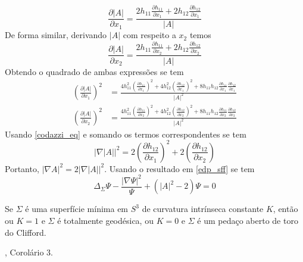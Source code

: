 \begin{demonstracao}
	\begin{equation*}
		\frac{\partial |A|}{\partial x_1} = \frac{2 h_{11} \frac{\partial h_{11}}{\partial x_1} + 2 h_{12} \frac{\partial h_{12}}{\partial x_1}}{|A|}
	\end{equation*}	
	De forma similar, derivando $ |A| $ com respeito a $ x_2 $ temos
	\begin{equation*}
		\frac{\partial |A|}{\partial x_2} = \frac{2 h_{11} \frac{\partial h_{11}}{\partial x_2} + 2 h_{12} \frac{\partial h_{12}}{\partial x_2}}{|A|}
	\end{equation*}	
	Obtendo o quadrado de ambas expressões se tem
	\begin{align*}
		\left( \frac{\partial |A|}{\partial x_1} \right)^2 &= \frac{4 h_{11}^2 \left( \frac{\partial h_{11}}{\partial x_1} \right)^2 + 4 h_{12}^2 \left( \frac{\partial h_{12}}{\partial x_1} \right)^2 + 8 h_{11} h_{12} \frac{\partial h_{11}}{\partial x_1} \frac{\partial h_{12}}{\partial x_1}}{|A|^2}\\
		\left( \frac{\partial |A|}{\partial x_2} \right)^2 &= \frac{4 h_{11}^2 \left( \frac{\partial h_{11}}{\partial x_2} \right)^2 + 4 h_{12}^2 \left( \frac{\partial h_{12}}{\partial x_2} \right)^2 + 8 h_{11} h_{12} \frac{\partial h_{11}}{\partial x_2} \frac{\partial h_{12}}{\partial x_2}}{|A|^2}
	\end{align*}	
	Usando \eqref{codazzi_eq} e somando os termos correspondentes se tem
	\begin{equation*}
		| \nabla |A| |^2 = 2 \left( \frac{\partial h_{12}}{\partial x_1} \right)^2 + 2 \left( \frac{\partial h_{12}}{\partial x_2} \right)
	\end{equation*}	
	Portanto, $ | \nabla A |^2 = 2 | \nabla |A| |^2 $. Usando o resultado em \ref{edp_sff} se tem
	\begin{equation*}
		\Delta_\Sigma \Psi - \frac{|\nabla \Psi|^2}{\Psi} + (|A|^2 - 2) \Psi = 0
	\end{equation*}
\end{demonstracao}


\begin{teorema}[Lawson]\label{teo_lawson}
	Se $\Sigma$ é uma superfície mínima em $S^3$ de curvatura intrínseca constante $K$, então ou $K=1$ e $\Sigma$ é totalmente geodésica, ou $K=0$ e $\Sigma$ é um pedaço aberto de toro do Clifford.
\end{teorema}

\begin{demonstracao}
	\cite{Lawson1969}, Corolário 3.
\end{demonstracao}

